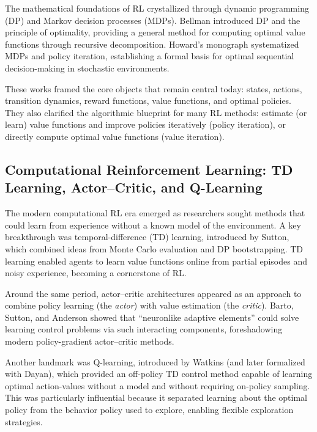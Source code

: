 \documentclass[sigconf]{acmart}
\begin{document}
The mathematical foundations of RL crystallized through dynamic programming (DP) and Markov decision processes (MDPs).
Bellman introduced DP and the principle of optimality, providing a general method for computing optimal value functions through recursive decomposition.\cite{bellman1957dynamic}
Howard's monograph systematized MDPs and policy iteration, establishing a formal basis for optimal sequential decision-making in stochastic environments.\cite{howard1960dynamic}

These works framed the core objects that remain central today: states, actions, transition dynamics, reward functions, value functions, and optimal policies.
They also clarified the algorithmic blueprint for many RL methods: estimate (or learn) value functions and improve policies iteratively (policy iteration), or directly compute optimal value functions (value iteration).\cite{bellman1957dynamic,howard1960dynamic}

\subsection{Computational Reinforcement Learning: TD Learning, Actor--Critic, and Q-Learning}

The modern computational RL era emerged as researchers sought methods that could learn from experience without a known model of the environment.
A key breakthrough was temporal-difference (TD) learning, introduced by Sutton, which combined ideas from Monte Carlo evaluation and DP bootstrapping.\cite{sutton1988td}
TD learning enabled agents to learn value functions online from partial episodes and noisy experience, becoming a cornerstone of RL.

Around the same period, actor--critic architectures appeared as an approach to combine policy learning (the \emph{actor}) with value estimation (the \emph{critic}).
Barto, Sutton, and Anderson showed that ``neuronlike adaptive elements'' could solve learning control problems via such interacting components, foreshadowing modern policy-gradient actor--critic methods.\cite{barto1983neuronlike}

Another landmark was Q-learning, introduced by Watkins (and later formalized with Dayan), which provided an off-policy TD control method capable of learning optimal action-values without a model and without requiring on-policy sampling.\cite{watkins1989thesis,watkins1992qlearning}
This was particularly influential because it separated learning about the optimal policy from the behavior policy used to explore, enabling flexible exploration strategies.
\end{document}
